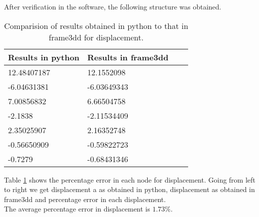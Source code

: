 After verification in the software, the following structure was obtained.\\

\begin{table}[h!]
	\centering
	\begin{tabular}{|l|l|l|l|}
		\hline
	      Results in python & Results in frame3dd   \\
		\hline
	
	      12.48407187  &12.1552098            \\
	     -6.04631381   &-6.03649343           \\
	      7.00856832   & 6.66504758           \\
	     -2.1838       &-2.11534409           \\
	      2.35025907   & 2.16352748           \\
	     -0.56650909   &-0.59822723           \\
         -0.7279       &-0.68431346           \\
        
		\hline  
	\end{tabular}
		\caption{Comparision of results obtained in python to that in frame3dd for displacement.}
\label{Comparision_table}
\end{table}

Table \ref{Comparision_table} shows the percentage error in each node for displacement. Going from left to right we get  displacement a as obtained in python, displacement as obtained in frame3dd and percentage error in each displacement.\\

The average percentage error in displacement is $1.73 \% $.\\



